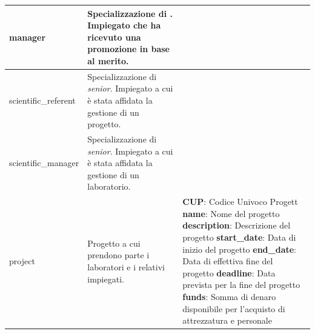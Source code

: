\begin{longtable}{@{}| p{} | p{} | p{} |}
	\hline
	manager              & \begin{minipage}[t]{0.4\textwidth}
		                       \raggedright
		                       Specializzazione di \textit{\baseemp}. Impiegato che ha ricevuto una promozione in base al merito.
	                       \end{minipage}
	                     &                                                                                                                   \\[25pt]
	\hline
	scientific\_referent & \begin{minipage}[t]{0.4\textwidth}
		                       \raggedright
		                       Specializzazione di \textit{senior}. Impiegato a cui è stata affidata la gestione di un progetto.
	                       \end{minipage}
	                     &                                                                                                                   \\[25pt]
	\hline
	scientific\_manager  & \begin{minipage}[t]{0.4\textwidth}
		                       \raggedright
		                       Specializzazione di \textit{senior}.  Impiegato a cui è stata affidata la gestione di un laboratorio.
	                       \end{minipage}
	                     &                                                                                                                   \\[25pt]
	\hline
	project              & \begin{minipage}[t]{0.4\textwidth}
		                       \raggedright
		                       Progetto a cui prendono parte i laboratori e i relativi impiegati.
	                       \end{minipage}
	                     & \begin{minipage}[t]{0.3\textwidth}
		                       \raggedright
		                       \textbf{CUP}: Codice Univoco Progett\sskip
		                       \textbf{name}: Nome del progetto\sskip
		                       \textbf{description}: Descrizione del progetto\sskip
		                       \textbf{start\_date}: Data di inizio del progetto\sskip
		                       \textbf{end\_date}: Data di effettiva fine del progetto\sskip
		                       \textbf{deadline}: Data prevista per la fine del progetto\sskip
		                       \textbf{funds}: Somma di denaro disponibile per l'acquisto di attrezzatura e personale

\end{minipage}
\end{longtable}
